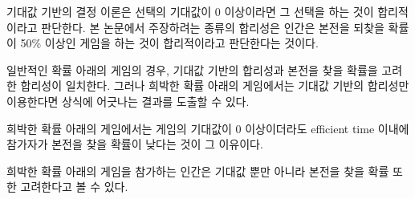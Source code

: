 기대값 기반의 결정 이론은 선택의 기대값이 0 이상이라면 그 선택을 하는 것이 합리적이라고 판단한다. 본 논문에서 주장하려는 종류의 합리성은 인간은 본전을 되찾을 확률이 50\% 이상인 게임을 하는 것이 합리적이라고 판단한다는 것이다.

일반적인 확률 아래의 게임의 경우, 기대값 기반의 합리성과 본전을 찾을 확률을 고려한 합리성이 일치한다. 그러나 희박한 확률 아래의 게임에서는 기대값 기반의 합리성만 이용한다면 상식에 어긋나는 결과를 도출할 수 있다.

희박한 확률 아래의 게임에서는 게임의 기대값이 0 이상이더라도 efficient time 이내에 참가자가 본전을 찾을 확률이 낮다는 것이 그 이유이다.

희박한 확률 아래의 게임을 참가하는 인간은 기대값 뿐만 아니라 본전을 찾을 확률 또한 고려한다고 볼 수 있다.
